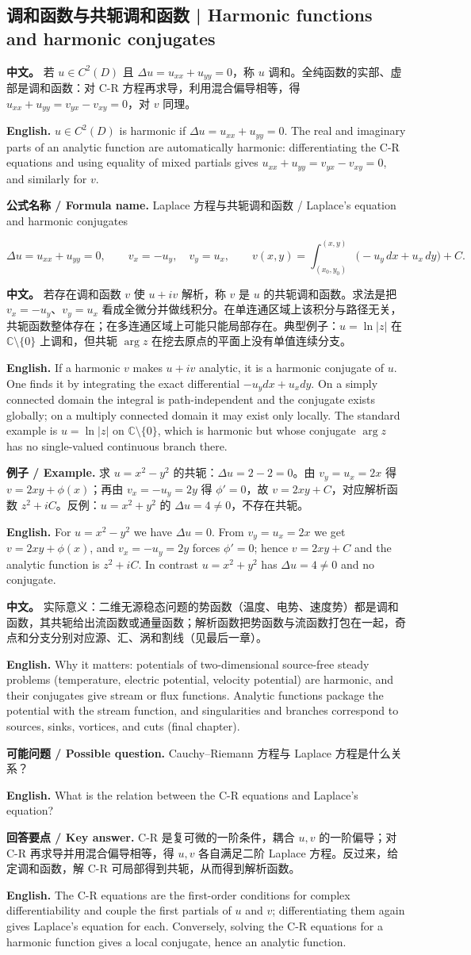 \documentclass[UTF8,11pt,a4paper]{ctexart}
\newcommand{\EN}[1]{\par\noindent \textbf{English.} #1\par}
\newcommand{\FORMULA}[2]{\par\noindent\textbf{公式名称 / Formula name.} #1 / #2\par}
\newcommand{\EX}[2]{\par\noindent \textbf{例子 / Example.} #1\par\EN{#2}}
\newcommand{\ASK}[4]{\par\noindent \textbf{可能问题 / Possible question.} #1\par\EN{#2}\noindent \textbf{回答要点 / Key answer.} #3\par\EN{#4}\medskip}
\newcommand{\APS}[2]{\par\noindent\textbf{中文。} #1\par\noindent\textbf{English.} #2\par\smallskip}
\begin{document}
\subsection{调和函数与共轭调和函数 | Harmonic functions and harmonic conjugates}
\APS{若 $u\in C^2(D)$ 且 $\Delta u=u_{xx}+u_{yy}=0$，称 $u$ 调和。全纯函数的实部、虚部是调和函数：对 C-R 方程再求导，利用混合偏导相等，得 $u_{xx}+u_{yy}=v_{yx}-v_{xy}=0$，对 $v$ 同理。}{$u\in C^2(D)$ is harmonic if $\Delta u=u_{xx}+u_{yy}=0$. The real and imaginary parts of an analytic function are automatically harmonic: differentiating the C-R equations and using equality of mixed partials gives $u_{xx}+u_{yy}=v_{yx}-v_{xy}=0$, and similarly for $v$.}
\FORMULA{Laplace 方程与共轭调和函数}{Laplace's equation and harmonic conjugates}
\[
\Delta u=u_{xx}+u_{yy}=0,\qquad
v_x=-u_y,\quad v_y=u_x,\qquad
v(x,y)=\int_{(x_0,y_0)}^{(x,y)}\big(-u_y\,dx+u_x\,dy\big)+C.
\]
\APS{若存在调和函数 $v$ 使 $u+iv$ 解析，称 $v$ 是 $u$ 的共轭调和函数。求法是把 $v_x=-u_y$、$v_y=u_x$ 看成全微分并做线积分。在单连通区域上该积分与路径无关，共轭函数整体存在；在多连通区域上可能只能局部存在。典型例子：$u=\ln|z|$ 在 $\mathbb C\setminus\{0\}$ 上调和，但共轭 $\arg z$ 在挖去原点的平面上没有单值连续分支。}{If a harmonic $v$ makes $u+iv$ analytic, it is a harmonic conjugate of $u$. One finds it by integrating the exact differential $-u_y dx+u_x dy$. On a simply connected domain the integral is path-independent and the conjugate exists globally; on a multiply connected domain it may exist only locally. The standard example is $u=\ln|z|$ on $\mathbb C\setminus\{0\}$, which is harmonic but whose conjugate $\arg z$ has no single-valued continuous branch there.}
\EX{求 $u=x^2-y^2$ 的共轭：$\Delta u=2-2=0$。由 $v_y=u_x=2x$ 得 $v=2xy+\phi(x)$；再由 $v_x=-u_y=2y$ 得 $\phi'=0$，故 $v=2xy+C$，对应解析函数 $z^2+iC$。反例：$u=x^2+y^2$ 的 $\Delta u=4\ne0$，不存在共轭。}{For $u=x^2-y^2$ we have $\Delta u=0$. From $v_y=u_x=2x$ we get $v=2xy+\phi(x)$, and $v_x=-u_y=2y$ forces $\phi'=0$; hence $v=2xy+C$ and the analytic function is $z^2+iC$. In contrast $u=x^2+y^2$ has $\Delta u=4\ne0$ and no conjugate.}
\APS{实际意义：二维无源稳态问题的势函数（温度、电势、速度势）都是调和函数，其共轭给出流函数或通量函数；解析函数把势函数与流函数打包在一起，奇点和分支分别对应源、汇、涡和割线（见最后一章）。}{Why it matters: potentials of two-dimensional source-free steady problems (temperature, electric potential, velocity potential) are harmonic, and their conjugates give stream or flux functions. Analytic functions package the potential with the stream function, and singularities and branches correspond to sources, sinks, vortices, and cuts (final chapter).}
\ASK{Cauchy--Riemann 方程与 Laplace 方程是什么关系？}{What is the relation between the C-R equations and Laplace's equation?}{C-R 是复可微的一阶条件，耦合 $u,v$ 的一阶偏导；对 C-R 再求导并用混合偏导相等，得 $u,v$ 各自满足二阶 Laplace 方程。反过来，给定调和函数，解 C-R 可局部得到共轭，从而得到解析函数。}{The C-R equations are the first-order conditions for complex differentiability and couple the first partials of $u$ and $v$; differentiating them again gives Laplace's equation for each. Conversely, solving the C-R equations for a harmonic function gives a local conjugate, hence an analytic function.}
\end{document}

